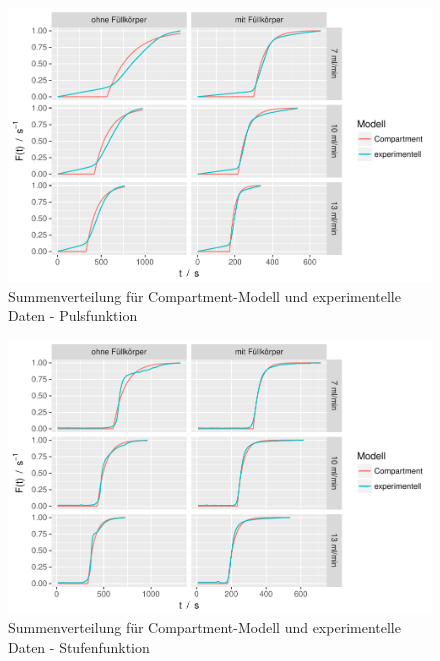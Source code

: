\documentclass[12pt,liststotoc]{report}
\begin{document}
\begin{figure}[H]
\centering
\includegraphics[width=1\textwidth]{Graphics/comp_stoss.pdf}
\caption[Compartment-Modell Stoßfunktion]{Summenverteilung für Compartment-Modell und experimentelle Daten - Pulsfunktion}
\label{fig:summe_comp_pulse}
\end{figure}
\noindent

\begin{figure}[H]
\centering
\includegraphics[width=1\textwidth]{Graphics/comp_step.pdf}
\caption[Compartment-Modell Sprungfunktion]{Summenverteilung für Compartment-Modell und experimentelle Daten - Stufenfunktion}
\label{fig:summe_comp_step}
\end{figure}
\noindent
\end{document}
